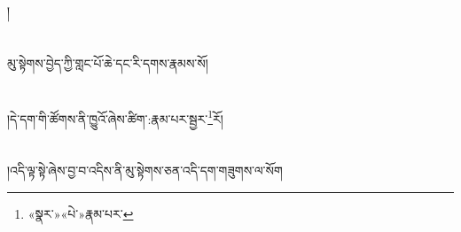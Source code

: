 །\chapter{ }མུ་སྟེགས་བྱེད་ཀྱི་གླང་པོ་ཆེ་དང་རི་དགས་རྣམས་སོ།\chapter{ }།དེ་དག་གི་ཚོགས་ནི་ཁྱུའོ་ཞེས་ཚིག་:རྣམ་པར་སྦྱར་\footnote{«སྣར་»«པེ་»རྣམ་པར་}རོ།\chapter{ }།འདི་ལྟ་སྟེ་ཞེས་བྱ་བ་འདིས་ནི་མུ་སྟེགས་ཅན་འདི་དག་གཟུགས་ལ་སོག